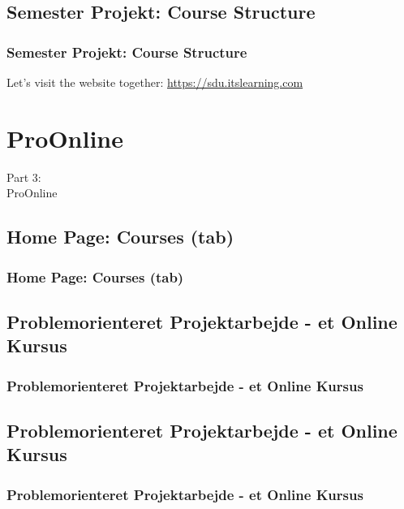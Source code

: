 \documentclass[t, aspectratio=169]{beamer}
\begin{document}
\subsection{Semester Projekt: Course Structure}
\begin{frame}[fragile]
  \frametitle{Semester Projekt: Course Structure}
  \vspace{30mm}
  \begin{center}
    Let's visit the website together: \textcolor{blue}{\url{https://sdu.itslearning.com}}
  \end{center}
\end{frame}

\section{ProOnline}
\begin{frame}
  \vspace{25mm}
  \begin{center}
    \Huge{Part 3:\\ProOnline}
  \end{center}
\end{frame}

\subsection{Home Page: Courses (tab)}
\begin{frame}[fragile]
  \frametitle{Home Page: Courses (tab)}
  \vspace{1mm}
  
\end{frame}

\subsection{Problemorienteret Projektarbejde - et Online Kursus}
\begin{frame}[fragile]
  \frametitle{Problemorienteret Projektarbejde - et Online Kursus}
  \vspace{1mm}
  
\end{frame}

\subsection{Problemorienteret Projektarbejde - et Online Kursus}
\begin{frame}[fragile]
  \frametitle{Problemorienteret Projektarbejde - et Online Kursus}
  \vspace{1mm}
  
\end{frame}
\end{document}

